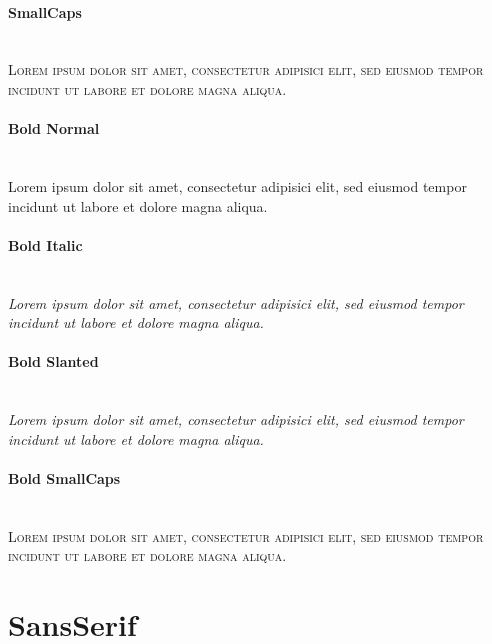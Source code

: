 \paragraph{SmallCaps}\hfill\\
{\scshape
Lorem ipsum dolor sit amet, consectetur adipisici elit, sed eiusmod tempor
incidunt ut labore et dolore magna aliqua.}

{\bfseries
\paragraph{Bold Normal}\hfill\\
{
Lorem ipsum dolor sit amet, consectetur adipisici elit, sed eiusmod tempor
incidunt ut labore et dolore magna aliqua.}
\paragraph{Bold Italic}\hfill\\
{\itshape
Lorem ipsum dolor sit amet, consectetur adipisici elit, sed eiusmod tempor
incidunt ut labore et dolore magna aliqua.}
\paragraph{Bold Slanted}\hfill\\
{\slshape
Lorem ipsum dolor sit amet, consectetur adipisici elit, sed eiusmod tempor
incidunt ut labore et dolore magna aliqua.}
\paragraph{Bold SmallCaps}\hfill\\
{\scshape
Lorem ipsum dolor sit amet, consectetur adipisici elit, sed eiusmod tempor
incidunt ut labore et dolore magna aliqua.}
}

\section*{SansSerif}

